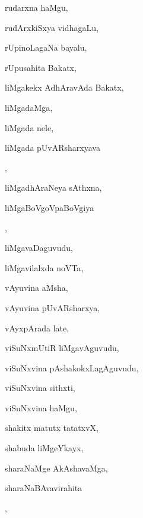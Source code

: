 \begin{multicols}{3}
{\noindent
{rudarxna haMgu}, \pageref{rudarxna haMgu}

\noindent
{rudArxkiSxya vidhagaLu}, \pageref{rudArxkiSxya vidhagaLu}

\noindent
{rUpinoLagaNa bayalu}, \pageref{rUpinoLagaNa bayalu}

\noindent
{rUpusahita Bakatx}, \pageref{rUpusahita Bakatx}

\noindent
{liMgakekx AdhAravAda Bakatx}, \pageref{liMgakekx AdhAravAda Bakatx}

\noindent
{liMgadaMga}, \pageref{liMgadaMga}

\noindent
{liMgada nele}, \pageref{liMgada nele}

\noindent
{liMgada pUvARsharxyava}

\noindent
{}, \pageref{liMgada pUvARsharxyava kaLeyuvudu}

\noindent
{liMgadhAraNeya sAthxna}, \pageref{liMgadhAraNeya sAthxna}

\noindent
{liMgaBoVgoVpaBoVgiya}

\noindent
{}, \pageref{liMgaBoVgoVpaBoVgiya saMgasuKa}

\noindent
{liMgavaDaguvudu}, \pageref{liMgavaDaguvudu}

\noindent
{liMgavilalxda noVTa}, \pageref{liMgavilalxda noVTa}

\noindent
{vAyuvina aMsha}, \pageref{vAyuvina aMsha}

\noindent
{vAyuvina pUvARsharxya}, \pageref{vAyuvina pUvARsharxya}

\noindent
{vAyxpArada late}, \pageref{vAyxpArada late}

\noindent
{viSuNxmUtiR liMgavAguvudu}, \pageref{viSuNxmUtiR liMgavAguvudu}

\noindent
{viSuNxvina pAshakokxLagAguvudu}, \pageref{viSuNxvina pAshakokxLagAguvudu}

\noindent
{viSuNxvina sithxti}, \pageref{viSuNxvina sithxti}

\noindent
{viSuNxvina haMgu}, \pageref{viSuNxvina haMgu}

\noindent
{shakitx matutx tatatxvX}, \pageref{shakitx matutx tatatxvX}

\noindent
{shabuda liMgeYkayx}, \pageref{shabuda liMgeYkayx}

\noindent
{sharaNaMge AkAshavaMga}, \pageref{sharaNaMge AkAshavaMga}

\noindent
{sharaNaBAvavirahita}

\noindent
{}, \pageref{sharaNaBAvavirahita samayxgfjAcnxni}

}
\end{multicols}
